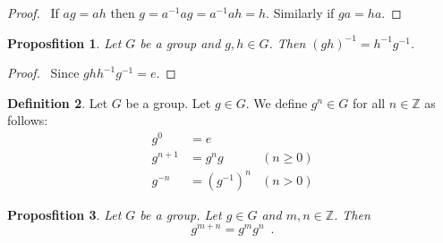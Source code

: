 \documentclass{book}
\let\qed\relax
\newtheorem{prop}{Proposfition}[chapter]
\theoremstyle{definition}
\newtheorem{df}[prop]{Definition}
\newcommand{\inv}[1]{\ensuremath{{#1}^{-1}}}
\begin{document}
\begin{proof}
    \pf\ If $ag = ah$ then $g = \inv{a} a g = \inv{a} a h = h$. Similarly if $ga = ha$. \qed
\end{proof}

\begin{prop}
    Let $G$ be a group and $g,h \in G$. Then $(gh)^{-1} = h^{-1}g^{-1}$.
\end{prop}

\begin{proof}
    \pf\ Since $ghh^{-1}g^{-1} = e$. \qed
\end{proof}

\begin{df}
\label{df:power-in-group}
    Let $G$ be a group. Let $g \in G$. We define $g^n \in G$ for all $n \in \mathbb{Z}$ as follows:
    \begin{align*}
        g^0     & = e                       \\
        g^{n+1} & = g^n g      & (n \geq 0) \\
        g^{-n}  & = (g^{-1})^n & (n > 0)
    \end{align*}
\end{df}

\begin{prop}
    \label{prop:power-add}
    Let $G$ be a group. Let $g \in G$ and $m,n \in \mathbb{Z}$. Then
    \[ g^{m+n} = g^m g^n \enspace . \]
\end{prop}
\end{document}
